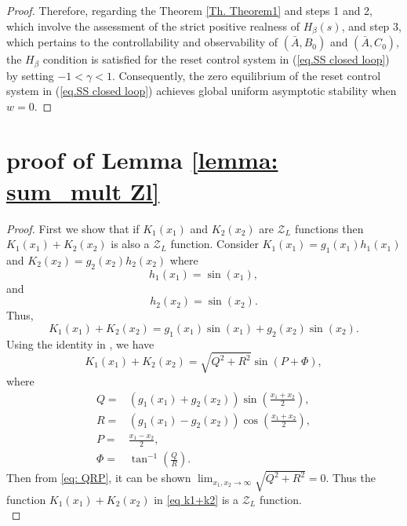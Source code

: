 \begin{proof}
Therefore, regarding the Theorem \ref{Th. Theorem1} and steps 1 and 2, which involve the assessment of the strict positive realness of $H_\beta (s)$, and step 3, which pertains to the controllability and observability of $(\bar{A},B_0)$ and $(\bar{A},C_0)$, the $H_\beta$ condition is satisfied for the reset control system in (\ref{eq.SS closed loop}) by setting $-1<\gamma<1$. Consequently, the zero equilibrium of the reset control system in (\ref{eq.SS closed loop}) achieves global uniform asymptotic stability when $w = 0$. 
\end{proof}
\section{proof of Lemma \ref{lemma: sum_mult Zl}}\label{App: III}
\begin{proof}
    First we show that if $K_1(x_1)$ and $K_2(x_2)$ are $\mathcal{Z}_L$ functions then $K_1(x_1)+ K_2(x_2)$ is also a $\mathcal{Z}_L$ function. Consider $K_1(x_1)=g_1(x_1)h_1(x_1)$ and $K_2(x_2)=g_2(x_2)h_2(x_2)$ where
    \begin{equation}
    h_1(x_1)=\sin{(x_1)},
    \end{equation}
    and
    \begin{equation}
    h_2(x_2)=\sin{(x_2)}.
    \end{equation}
Thus,
\begin{equation}
    K_1(x_1)+ K_2(x_2)=g_1(x_1)\sin{(x_1)}+g_2(x_2)\sin{(x_2)}.
\end{equation}
Using the identity in \cite{SINaSINb}, we have
\begin{equation}
\label{eq k1+k2}
    K_1(x_1)+ K_2(x_2)=\sqrt{Q^2+R^2}\sin{(P+\Phi)},
\end{equation}
where
\begin{equation}
\label{eq: QRP}
    \begin{split}
    Q=&\left(g_1(x_1)+g_2(x_2)\right)\sin{\left(\frac{x_1+x_2}{2}\right)},\\
        R=&\left(g_1(x_1)-g_2(x_2)\right)\cos{\left(\frac{x_1+x_2}{2}\right)},\\
        P=&\frac{x_1-x_2}{2},\\
        \Phi=&\tan^{-1}{\left(\frac{Q}{R}\right)}.
    \end{split}
    \end{equation}
Then from \eqref{eq: QRP}, it can be shown $\lim_{x_1,x_2 \to \infty} \sqrt{Q^2+R^2}=0$. Thus the function $ K_1(x_1)+ K_2(x_2)$ in \eqref{eq k1+k2} is a $\mathcal{Z}_L$ function.\\

\end{proof}
